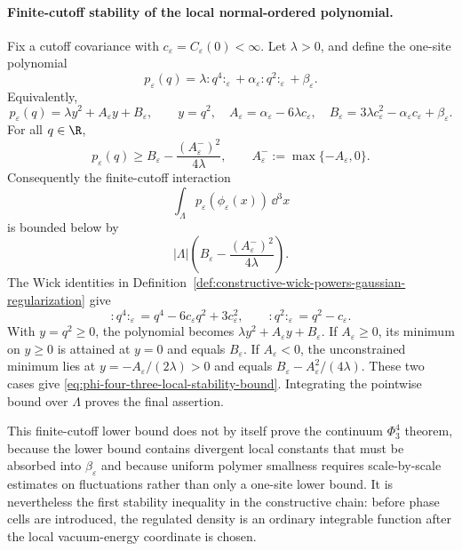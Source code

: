 \paragraph{Finite-cutoff stability of the local normal-ordered polynomial.}
Fix a cutoff covariance with \(c_\varepsilon=C_\varepsilon(0)<\infty\).
Let \(\lambda>0\), and define the one-site polynomial
\[
  p_\varepsilon(q)
  =
  \lambda:\!q^4\!:_\varepsilon
  +\alpha_\varepsilon:\!q^2\!:_\varepsilon
  +\beta_\varepsilon .
\]
Equivalently,
\[
  p_\varepsilon(q)
  =
  \lambda y^2+A_\varepsilon y+B_\varepsilon,
  \qquad
  y=q^2,\quad
  A_\varepsilon=\alpha_\varepsilon-6\lambda c_\varepsilon,\quad
  B_\varepsilon=3\lambda c_\varepsilon^2-\alpha_\varepsilon c_\varepsilon
  +\beta_\varepsilon .
\]
For all \(q\in\R\),
\begin{equation}
  p_\varepsilon(q)
  \geq
  B_\varepsilon-\frac{(A_\varepsilon^-)^2}{4\lambda},
  \qquad
  A_\varepsilon^-:=\max\{-A_\varepsilon,0\}.
  \label{eq:phi-four-three-local-stability-bound}
\end{equation}
Consequently the finite-cutoff interaction
\[
  \int_\Lambda p_\varepsilon(\phi_\varepsilon(x))\,\dd^3x
\]
is bounded below by
\[
  |\Lambda|\left(
    B_\varepsilon-\frac{(A_\varepsilon^-)^2}{4\lambda}
  \right).
\]
The Wick identities in
Definition~\ref{def:constructive-wick-powers-gaussian-regularization} give
\[
  :\!q^4\!:_\varepsilon=q^4-6c_\varepsilon q^2
  +3c_\varepsilon^2,
  \qquad
  :\!q^2\!:_\varepsilon=q^2-c_\varepsilon .
\]
With \(y=q^2\geq0\), the polynomial becomes
\(\lambda y^2+A_\varepsilon y+B_\varepsilon\).  If
\(A_\varepsilon\geq0\), its minimum on \(y\geq0\) is attained at \(y=0\) and
equals \(B_\varepsilon\).  If \(A_\varepsilon<0\), the unconstrained minimum
lies at \(y=-A_\varepsilon/(2\lambda)>0\) and equals
\(B_\varepsilon-A_\varepsilon^2/(4\lambda)\).  These two cases give
\eqref{eq:phi-four-three-local-stability-bound}.  Integrating the pointwise
bound over \(\Lambda\) proves the final assertion.

This finite-cutoff lower bound does not by
itself prove the continuum \(\Phi^4_3\) theorem, because the lower bound
contains divergent local constants that must be absorbed into
\(\beta_\varepsilon\) and because uniform polymer smallness requires
scale-by-scale estimates on fluctuations rather than only a one-site lower
bound.  It is nevertheless the first stability inequality in the constructive
chain: before phase cells are introduced, the regulated density is an
ordinary integrable function after the local vacuum-energy coordinate is
chosen.

